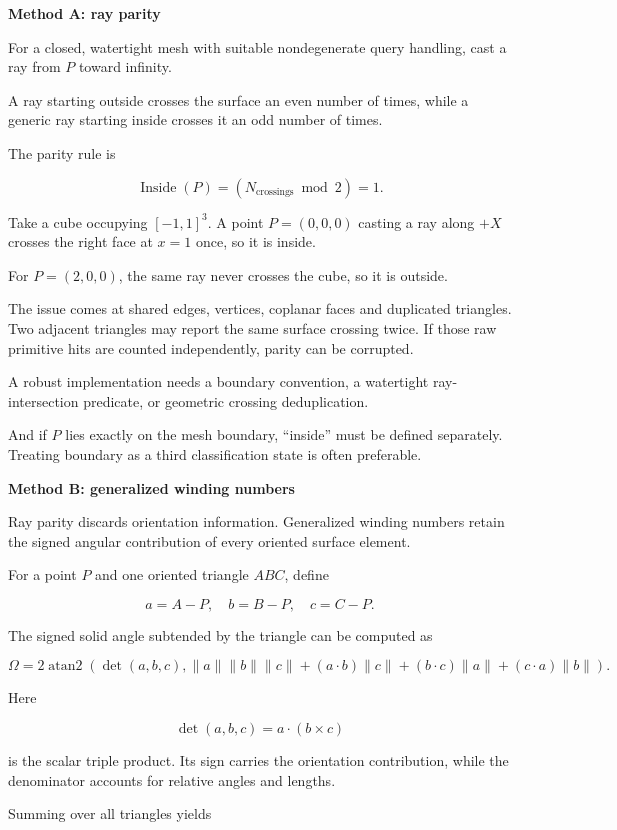 \textbf{Method A: ray parity}

For a closed, watertight mesh with suitable nondegenerate query handling, cast a ray from \(P\) toward infinity.

A ray starting outside crosses the surface an even number of times, while a generic ray starting inside crosses it an odd number of times.

The parity rule is

\[
\operatorname{Inside}(P)=(N_{\text{crossings}}\bmod2)=1.
\]

Take a cube occupying \([-1,1]^3\). A point \(P=(0,0,0)\) casting a ray along \(+X\) crosses the right face at \(x=1\) once, so it is inside.

For \(P=(2,0,0)\), the same ray never crosses the cube, so it is outside.

The issue comes at shared edges, vertices, coplanar faces and duplicated triangles. Two adjacent triangles may report the same surface crossing twice. If those raw primitive hits are counted independently, parity can be corrupted.

A robust implementation needs a boundary convention, a watertight ray-intersection predicate, or geometric crossing deduplication.

And if \(P\) lies exactly on the mesh boundary, ``inside'' must be defined separately. Treating boundary as a third classification state is often preferable.

\textbf{Method B: generalized winding numbers}

Ray parity discards orientation information. Generalized winding numbers retain the signed angular contribution of every oriented surface element.

For a point \(P\) and one oriented triangle \(ABC\), define

\[
a=A-P,\quad b=B-P,\quad c=C-P.
\]

The signed solid angle subtended by the triangle can be computed as

\[
\Omega= 2\operatorname{atan2} \left( \det(a,b,c), \|a\|\|b\|\|c\| +(a\cdot b)\|c\| +(b\cdot c)\|a\| +(c\cdot a)\|b\| \right).
\]

Here

\[
\det(a,b,c)=a\cdot(b\times c)
\]

is the scalar triple product. Its sign carries the orientation contribution, while the denominator accounts for relative angles and lengths.

Summing over all triangles yields

